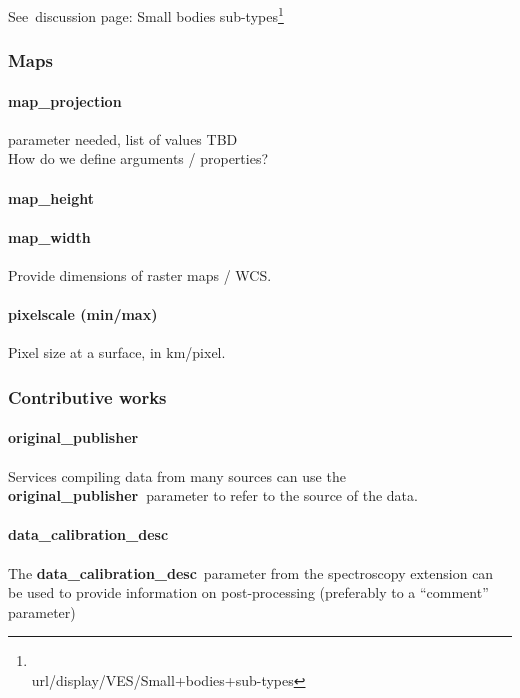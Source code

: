\documentclass[11pt,a4paper]{ivoa}
\begin{document}
See discussion page: Small bodies sub-types\footnote{\\url{/display/VES/Small+bodies+sub-types}}

\subsubsection{Maps\\}

\paragraph{map\_projection}

parameter needed, list of values TBD\\How do we define arguments / properties?

\paragraph{map\_height}

\paragraph{map\_width}

Provide dimensions of raster maps / WCS.

\paragraph{pixelscale (min/max)}

Pixel size at a surface, in km/pixel.

\subsubsection{Contributive works\\}

\paragraph{original\_publisher}

Services compiling data from many sources can use the \textbf{original\_publisher }parameter to refer to the source of the data.

\paragraph{data\_calibration\_desc}

The\textbf{ \textbf{data\_calibration\_desc}} parameter from the spectroscopy extension can be used to provide information on post-processing (preferably to a ``comment'' parameter)
\end{document}
